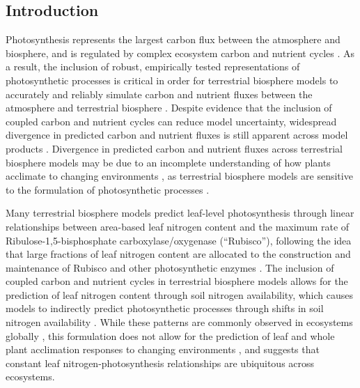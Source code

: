 \begin{singlespace}
    \chapter{\textbf{Introduction}}
\end{singlespace}

Photosynthesis represents the largest carbon flux between the atmosphere and biosphere, and is regulated by complex ecosystem carbon and nutrient cycles . As a result, the inclusion of robust, empirically tested representations of photosynthetic processes is critical in order for terrestrial biosphere models to accurately and reliably simulate carbon and nutrient fluxes between the atmosphere and terrestrial biosphere . Despite evidence that the inclusion of coupled carbon and nutrient cycles can reduce model uncertainty, widespread divergence in predicted carbon and nutrient fluxes is still apparent across model products . Divergence in predicted carbon and nutrient fluxes across terrestrial biosphere models may be due to an incomplete understanding of how plants acclimate to changing environments , as terrestrial biosphere models are sensitive to the formulation of photosynthetic processes .

Many terrestrial biosphere models predict leaf-level photosynthesis through linear relationships between area-based leaf nitrogen content and the maximum rate of Ribulose-1,5-bisphosphate carboxylase/oxygenase (``Rubisco''), following the idea that large fractions of leaf nitrogen content are allocated to the construction and maintenance of Rubisco and other photosynthetic enzymes . The inclusion of coupled carbon and nutrient cycles in terrestrial biosphere models  allows for the prediction of leaf nitrogen content through soil nitrogen availability, which causes models to indirectly predict photosynthetic processes through shifts in soil nitrogen availability . While these patterns are commonly observed in ecosystems globally , this formulation does not allow for the prediction of leaf and whole plant acclimation responses to changing environments , and suggests that constant leaf nitrogen-photosynthesis relationships are ubiquitous across ecosystems. 

